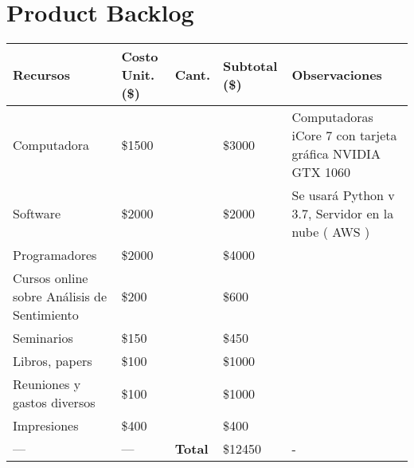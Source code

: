 \chapter{Product Backlog}



\begin{tabular}{ |p{4.25cm}|p{1.5cm}|p{1cm}|p{1.5cm}|p{5cm}| }
	\hline
	\rowcolor{gray!40}  \textbf{Recursos}         & \textbf{Costo Unit.(\$)}      & \textbf{Cant.} & \textbf{Subtotal (\$)} & \textbf{Observaciones}   \\  \hline
	Computadora                        & \raggedleft \$1500  &\centering 2  &\raggedleft \$3000  &  Computadoras iCore 7 con tarjeta gr\'afica NVIDIA GTX 1060    \\   \hline
	Software                        & \raggedleft \$2000  &\centering 1  &\raggedleft \$2000  &  Se usar\'a Python v 3.7, Servidor en la nube ( AWS )    \\   \hline
	Programadores              & \raggedleft \$2000    & \centering 2  &\raggedleft \$4000   & \\   \hline
	Cursos online sobre An\'alisis de Sentimiento              &\raggedleft  \$200    &\centering 3  &\raggedleft  \$600   & \\   \hline
	Seminarios              & \raggedleft \$150    & \centering 3  &\raggedleft \$450   & \\   \hline
	Libros, papers              & \raggedleft \$100    & \centering 10  &\raggedleft \$1000   & \\   \hline
	Reuniones y gastos diversos              & \raggedleft \$100    & \centering 10  &\raggedleft \$1000   & \\   \hline
	Impresiones              & \raggedleft \$400    & \centering 1  &\raggedleft \$400   & \\   \hline
	\centering          ---           &   \centering   --- & \cellcolor{gray!40} \textbf{Total}   &\raggedleft \$12450   &  -  \\   \hline
\end{tabular}